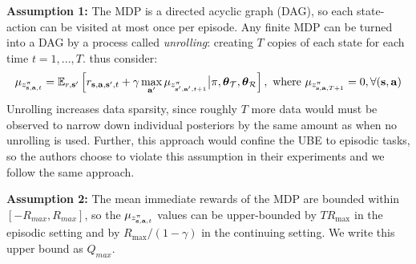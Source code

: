 \documentclass{article}
\begin{document}
\begin{appendices}
\textbf{Assumption 1:} The MDP is a directed acyclic graph (DAG), so each state-action can be visited at most once per episode. Any finite MDP can be turned into a DAG by a process called \textit{unrolling}: creating $T$ copies of each state for each time $t = 1, ..., T$. \cite{ube} thus consider:
\begin{align} \label{app:eq:bet}
\mu_{z^\pi_{\mathbf{s}, \mathbf{a}, t}} = \operatorname{\mathbb{E}}_{r, \mathbf{s}'}\left[ r_{\mathbf{s}, \mathbf{a}, \mathbf{s}', t} + \gamma \max_{\mathbf{a}'}  \mu_{z^\pi_{\mathbf{s}', \mathbf{a}', t + 1}} \big| \pi, \boldsymbol{\theta}_{\mathcal{T}}, \boldsymbol{\theta}_{\mathcal{R}} \right], \text{ where } \mu_{z^\pi_{\mathbf{s}, \mathbf{a}, T + 1}} = 0, \forall (\mathbf{s}, \mathbf{a})
\end{align}
Unrolling increases data sparsity, since roughly $T$ more data would must be observed to narrow down individual posteriors by the same amount as when no unrolling is used. Further, this approach would confine the UBE to episodic tasks, so the authors choose to violate this assumption in their experiments and we follow the same approach.

\textbf{Assumption 2:} The mean immediate rewards of the MDP are bounded within $[-R_{max}, R_{max}]$, so the $\mu_{z^\pi_{\mathbf{s}, \mathbf{a}, t}}$ values can be upper-bounded by $T R_{\max}$ in the episodic setting and by $R_{\max} / (1 - \gamma)$ in the continuing setting. We write this upper bound as $Q_{max}$.



\end{appendices}
\end{document}

